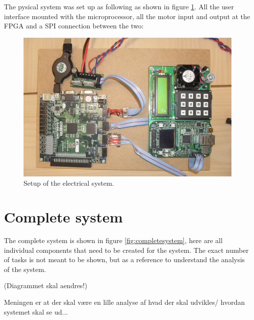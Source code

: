 The pysical system was set up as following as shown in figure \ref{fig:digitalsystem}. All the user interface mounted with the microprocessor, all the motor input and output at the FPGA and a SPI connection between the two:

\begin{figure}[htb]
	\begin{center}
	\includegraphics[scale=1,trim=0 0 0 0]{graphics/digitalsystem.png} %
	\caption{Setup of the electrical system.}
	\label{fig:digitalsystem}			%
	\end{center}
\end{figure}

\section{Complete system}

The complete system is shown in figure \ref{fig:completesystem}, here are all individual components that need to be created for the system. The exact number of tasks is not meant to be shown, but as a reference to understand the analysis of the system.

(Diagrammet skal aendres!)

Meningen er at der skal være en lille analyse af hvad der skal udvikles/ hvordan systemet skal se ud...


